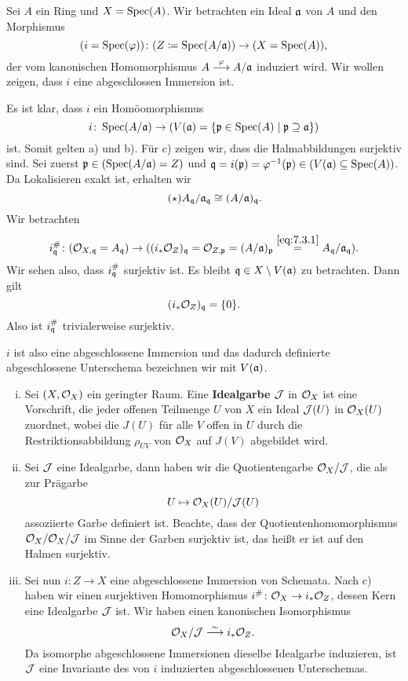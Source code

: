 \begin{kons}
\label{kons:7.3}
	Sei $A$ ein Ring und $X = \operatorname{Spec}(A)$. Wir betrachten ein Ideal $\mathfrak{a}$ von $A$ und den Morphismus
	\[
		(i=\operatorname{Spec}(\varphi))\colon (Z\coloneqq \operatorname{Spec}(A/\mathfrak{a})) \to (X=\operatorname{Spec}(A)),
	\]
	der vom kanonischen Homomorphismus $A \overset{\varphi}{\longrightarrow}A/\mathfrak{a}$ induziert wird. Wir wollen zeigen, dass $i$ eine abgeschlossen Immersion ist.

	Es ist klar, dass $i$ ein Homöomorphismus
	\[
		i \colon \operatorname{Spec}(A/\mathfrak{a}) \to (V(\mathfrak{a})=\{\mathfrak{p} \in \operatorname{Spec}(A) \mid \mathfrak{p} \supseteq \mathfrak{a}\})
	\]
	ist. Somit gelten a) und b). Für c) zeigen wir, dass die Halmabbildungen surjektiv sind. Sei zuerst $\mathfrak{p} \in (\operatorname{Spec}(A/\mathfrak{a}) = Z)$ und $\mathfrak{q} = i(\mathfrak{p}) = \varphi^{-1}(\mathfrak{p})\in (V(\mathfrak{a}) \subseteq \operatorname{Spec}(A))$. Da Lokalisieren exakt ist, erhalten wir
	\begin{equation*}
	\label{eq:7.3.1}\tag{$\star$}
		A_{\mathfrak{q}}/\mathfrak{a}_{\mathfrak{q}} \cong (A/\mathfrak{a})_{\mathfrak{q}}.
	\end{equation*}
	Wir betrachten
	\[
		i_{\mathfrak{q}}^{\#}\colon (\mathcal{O}_{X,\mathfrak{q}} = A_{\mathfrak{q}}) \to ((i_*\mathcal{O}_Z)_{\mathfrak{q}} = \mathcal{O}_{Z,\mathfrak{p}} = (A/\mathfrak{a})_{\mathfrak{p}} \overset{\eqref{eq:7.3.1}}{=} A_{\mathfrak{q}}/\mathfrak{a}_{\mathfrak{q}}).
	\]
	Wir sehen also, dass $i_{\mathfrak{q}}^{\#}$ surjektiv ist. Es bleibt $\mathfrak{q} \in X \setminus V(\mathfrak{a})$ zu betrachten. Dann gilt
	\[
		(i_*\mathcal{O}_Z)_{\mathfrak{q}} = \{0\}.
	\]
	Also ist $i_{\mathfrak{q}}^{\#}$ trivialerweise surjektiv.

	$i$ ist also eine abgeschlossene Immersion und das dadurch definierte abgeschlossene Unterschema bezeichnen wir mit $V(\mathfrak{a})$.
\end{kons}

\begin{bem}
\label{bem:7.4}
	\begin{enumerate}[i)]
		\item Sei $(X,\mathcal{O}_X)$ ein geringter Raum. Eine \textbf{Idealgarbe} $\mathcal{J}$ in $\mathcal{O}_X$ ist eine Vorschrift, die jeder offenen Teilmenge $U$ von $X$ ein Ideal $\mathcal{J}(U)$ in $\mathcal{O}_X(U)$ zuordnet, wobei die $J(U)$ für alle $V$ offen in $U$ durch die Restriktionsabbildung $\rho_{UV}$ von $\mathcal{O}_X$ auf $J(V)$ abgebildet wird.
		\item Sei $\mathcal{J}$ eine Idealgarbe, dann haben wir die Quotientengarbe $\mathcal{O}_X/\mathcal{J}$, die als zur Prägarbe
		\[
			U \mapsto \mathcal{O}_X(U)/\mathcal{J}(U)
		\]
		assoziierte Garbe definiert ist. Beachte, dass der Quotientenhomomorphismus $\mathcal{O}_X/\mathcal{O}_X/\mathcal{J}$ im Sinne der Garben surjektiv ist, das heißt er ist auf den Halmen surjektiv.
		\item Sei nun $i \colon Z \to X$ eine abgeschlossene Immersion von Schemata. Nach c) haben wir einen surjektiven Homomorphismus $i^{\#}\colon \mathcal{O}_X \to i_*\mathcal{O}_Z$, dessen Kern eine Idealgarbe $\mathcal{J}$ ist. Wir haben einen kanonischen Isomorphismus
		\[
			\mathcal{O}_X/\mathcal{J} \overset{\sim}{\longrightarrow} i_*\mathcal{O}_Z.
		\]
		Da isomorphe abgeschlossene Immersionen dieselbe Idealgarbe induzieren, ist $\mathcal{J}$ eine Invariante des von $i$ induzierten abgeschlossenen Unterschemas.
	\end{enumerate}
\end{bem}

